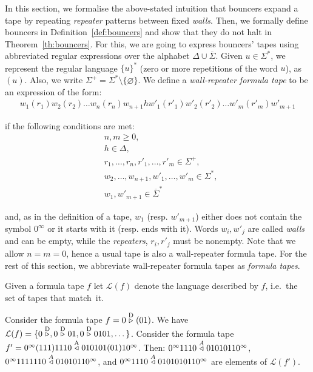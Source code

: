 In this section, we formalise the above-stated intuition that bouncers expand a tape by repeating \textit{repeater} patterns between fixed \textit{walls}. Then, we formally define bouncers in Definition~\ref{def:bouncers} and show that they do not halt in Theorem~\ref{th:bouncers}. For this, we are going to express bouncers' tapes using abbreviated regular expressions over the alphabet $\Delta \cup  \overline{\Sigma}$. Given $u\in\Sigma^*$, we represent the regular language $\{u\}^*$ (zero or more repetitions of the word $u$), as $(u)$. Also, we write $\Sigma^+ = \Sigma^* \setminus \{ \varnothing \}$. We define a \textit{wall-repeater formula tape} to be an expression of the form:
\begin{align}\label{math:formulaTapes}w_1(r_1)w_2(r_2)\dots w_n(r_n) w_{n+1} h w'_1(r'_1)w'_2(r'_2)\dots w'_m(r'_m) w'_{m+1}\end{align}

if the following conditions are met:
\begin{align*}
     & n,m \geq 0,                                     \\
     & h \in \Delta,                                   \\
     & r_1,\dots,r_n,r'_1,\dots,r'_m \in \Sigma^+,     \\
     & w_2,\dots,w_{n+1},w'_1,\dots,w'_m \in \Sigma^*, \\
     & w_1, w'_{m+1} \in  \overline{\Sigma}^*
\end{align*}

and, as in the definition of a tape, $w_1$ (resp. $w'_{m+1}$) either does not contain the symbol $0^\infty$ or it starts with it (resp. ends with it). Words $w_i, w'_j$ are called \textit{walls} and can be empty, while the \textit{repeaters}, $r_i, r'_j$ must be nonempty. Note that we allow $n=m=0$, hence a usual tape is also a wall-repeater formula tape. For the rest of this section, we abbreviate wall-repeater formula tapes as \textit{formula tapes}.

Given a formula tape $f$ let $\mathcal{L}(f)$ denote the language described by $f$, i.e.\ the set of tapes that match~it.

\begin{example}\label{ex:formulaTapes}
    Consider the formula tape $f = 0 \stackrel{\text{D}}\triangleright (01)$. We have $\mathcal{L}(f) = \{0\stackrel{\text{D}}\triangleright,0\stackrel{\text{D}}\triangleright01,0\stackrel{\text{D}}\triangleright0101,\dots\}$. Consider the formula tape $f'=0^\infty(111)1110 \stackrel{\text{A}}\triangleleft 010101(01)10^\infty$. Then: $0^\infty 1110 \stackrel{A}\triangleleft 01010110^\infty$, $0^\infty 1111110 \stackrel{A}\triangleleft 01010110^\infty$, and $0^\infty 1110 \stackrel{A}\triangleleft 0101010110^\infty$ are elements of $\mathcal{L}(f')$.
\end{example}

